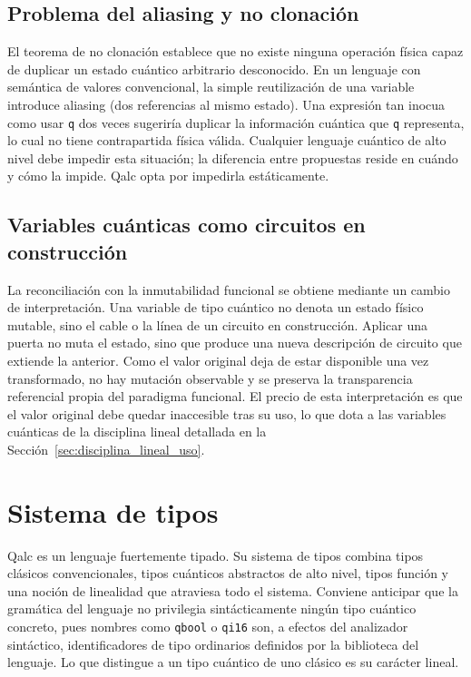 \subsection{Problema del aliasing y no clonación}

El teorema de no clonación establece que no existe ninguna operación física capaz de duplicar un estado cuántico arbitrario desconocido. En un lenguaje con semántica de valores convencional, la simple reutilización de una variable introduce aliasing (dos referencias al mismo estado). Una expresión tan inocua como usar \lstinline|q| dos veces sugeriría duplicar la información cuántica que \lstinline|q| representa, lo cual no tiene contrapartida física válida. Cualquier lenguaje cuántico de alto nivel debe impedir esta situación; la diferencia entre propuestas reside en cuándo y cómo la impide. Qalc opta por impedirla estáticamente.

\subsection{Variables cuánticas como circuitos en construcción}

La reconciliación con la inmutabilidad funcional se obtiene mediante un cambio de interpretación. Una variable de tipo cuántico no denota un estado físico mutable, sino el cable o la línea de un circuito en construcción. Aplicar una puerta no muta el estado, sino que produce una nueva descripción de circuito que extiende la anterior. Como el valor original deja de estar disponible una vez transformado, no hay mutación observable y se preserva la transparencia referencial propia del paradigma funcional. El precio de esta interpretación es que el valor original debe quedar inaccesible tras su uso, lo que dota a las variables cuánticas de la disciplina lineal detallada en la Sección~\ref{sec:disciplina_lineal_uso}.

\section{Sistema de tipos}

Qalc es un lenguaje fuertemente tipado. Su sistema de tipos combina tipos clásicos convencionales, tipos cuánticos abstractos de alto nivel, tipos función y una noción de linealidad que atraviesa todo el sistema. Conviene anticipar que la gramática del lenguaje no privilegia sintácticamente ningún tipo cuántico concreto, pues nombres como \lstinline|qbool| o \lstinline|qi16| son, a efectos del analizador sintáctico, identificadores de tipo ordinarios definidos por la biblioteca del lenguaje. Lo que distingue a un tipo cuántico de uno clásico es su carácter lineal.

